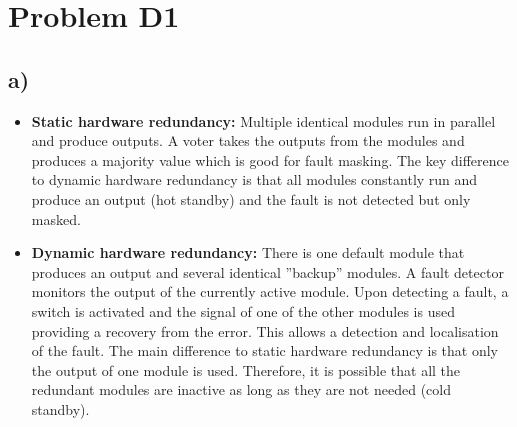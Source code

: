 \documentclass[12pt]{article}
\begin{document}
\lstset{language=C++}

\section*{Problem D1}
\subsection*{a)}
\begin{itemize}
\item \textbf{Static hardware redundancy:} Multiple identical modules run in parallel and produce outputs. A voter takes the outputs from the modules and produces a majority value which is good for fault masking. The key difference to dynamic hardware redundancy is that all modules constantly run and produce an output (hot standby) and the fault is not detected but only masked. 

\item \textbf{Dynamic hardware redundancy:} There is one default module that produces an output and several identical ''backup'' modules. A fault detector monitors the output of the currently active module. Upon detecting a fault, a switch is activated and the signal of one of the other modules is used providing a recovery from the error. This allows a detection and localisation of the fault. The main difference to static hardware redundancy is that only the output of one module is used. Therefore, it is possible that all the redundant modules are inactive as long as they are not needed (cold standby).
\end{itemize}
\end{document}
